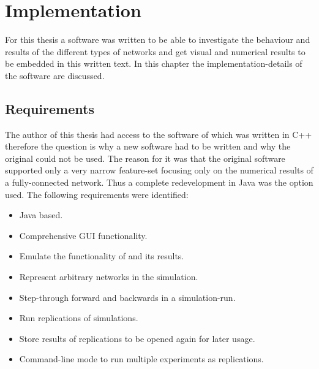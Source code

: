 \documentclass[Bachelorarbeit.tex]{subfiles}
\begin{document}
\graphicspath{{./figures/implementation/}}	%


\chapter{Implementation}
\label{ch:implementation}

For this thesis a software was written to be able to investigate the behaviour and results of the different types of networks and get visual and numerical results to be embedded in this written text. In this chapter the implementation-details of the software are discussed.

\section{Requirements}
The author of this thesis had access to the software of \cite{Breuer2015} which was written in C++ therefore the question is why a new software had to be written and why the original could not be used. The reason for it was that the original software supported only a very narrow feature-set focusing only on the numerical results of a fully-connected network. Thus a complete redevelopment in Java was the option used. The following requirements were identified:

\begin{itemize}
\item Java based.
\item Comprehensive GUI functionality.
\item Emulate the functionality of \cite{Breuer2015} and its results.
\item Represent arbitrary networks in the simulation.
\item Step-through forward and backwards in a simulation-run.
\item Run replications of simulations.
\item Store results of replications to be opened again for later usage.
\item Command-line mode to run multiple experiments as replications.
\end{itemize}
\end{document}
